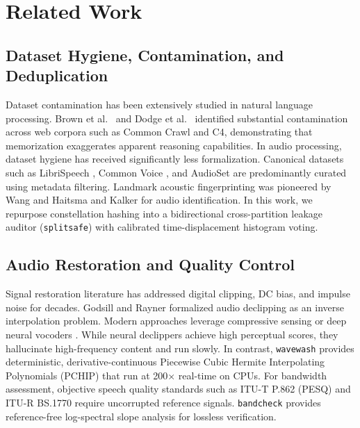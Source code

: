 \documentclass[10pt,journal,compsoc]{IEEEtran}
\begin{document}
\section{Related Work}
\subsection{Dataset Hygiene, Contamination, and Deduplication}
Dataset contamination has been extensively studied in natural language processing. Brown et al.\ \cite{brown2020gpt3} and Dodge et al.\ \cite{dodge2021c4} identified substantial contamination across web corpora such as Common Crawl and C4, demonstrating that memorization exaggerates apparent reasoning capabilities. In audio processing, dataset hygiene has received significantly less formalization. Canonical datasets such as LibriSpeech \cite{panayotov2015librispeech}, Common Voice \cite{ardila2020commonvoice}, and AudioSet \cite{gemmeke2017audioset} are predominantly curated using metadata filtering. Landmark acoustic fingerprinting was pioneered by Wang \cite{wang2003industrial} and Haitsma and Kalker \cite{haitsma2002highly} for audio identification. In this work, we repurpose constellation hashing into a bidirectional cross-partition leakage auditor (\texttt{splitsafe}) with calibrated time-displacement histogram voting.

\subsection{Audio Restoration and Quality Control}
Signal restoration literature has addressed digital clipping, DC bias, and impulse noise for decades. Godsill and Rayner \cite{godsill1998digital} formalized audio declipping as an inverse interpolation problem. Modern approaches leverage compressive sensing \cite{adler2012audio} or deep neural vocoders \cite{harviainen2021speech}. While neural declippers achieve high perceptual scores, they hallucinate high-frequency content and run slowly. In contrast, \texttt{wavewash} provides deterministic, derivative-continuous Piecewise Cubic Hermite Interpolating Polynomials (PCHIP) that run at 200$\times$ real-time on CPUs. For bandwidth assessment, objective speech quality standards such as ITU-T P.862 (PESQ) \cite{itu2001pesq} and ITU-R BS.1770 \cite{itu2015bs1770} require uncorrupted reference signals. \texttt{bandcheck} provides reference-free log-spectral slope analysis for lossless verification.
\end{document}
